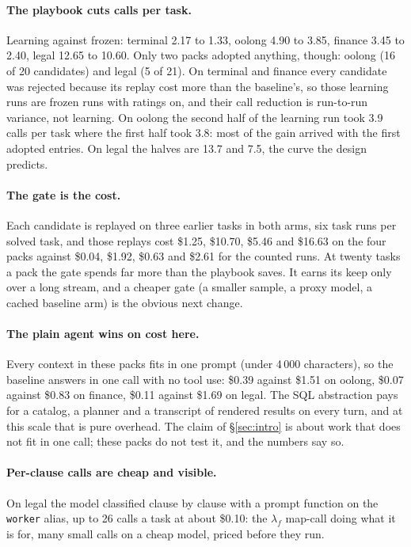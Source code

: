 \documentclass[11pt,a4paper]{article}
\newcommand{\code}[1]{\texttt{#1}}
\newcommand{\lmap}{\lambda_f}
\begin{document}
\paragraph{The playbook cuts calls per task.} Learning against frozen: terminal
2.17 to 1.33, oolong 4.90 to 3.85, finance 3.45 to 2.40, legal 12.65 to 10.60.
Only two packs adopted anything, though: oolong (16 of 20 candidates) and legal
(5 of 21). On terminal and finance every candidate was rejected because its
replay cost more than the baseline's, so those learning runs are frozen runs
with ratings on, and their call reduction is run-to-run variance, not learning.
On oolong the second half of the learning run took 3.9 calls per task where the
first half took 3.8: most of the gain arrived with the first adopted entries.
On legal the halves are 13.7 and 7.5, the curve the design predicts.

\paragraph{The gate is the cost.} Each candidate is replayed on three earlier
tasks in both arms, six task runs per solved task, and those replays cost
\$1.25, \$10.70, \$5.46 and \$16.63 on the four packs against \$0.04, \$1.92,
\$0.63 and \$2.61 for the counted runs. At twenty tasks a pack the gate spends
far more than the playbook saves. It earns its keep only over a long stream, and
a cheaper gate (a smaller sample, a proxy model, a cached baseline arm) is the
obvious next change.

\paragraph{The plain agent wins on cost here.} Every context in these packs fits
in one prompt (under 4\,000 characters), so the baseline answers in one call
with no tool use: \$0.39 against \$1.51 on oolong, \$0.07 against \$0.83 on
finance, \$0.11 against \$1.69 on legal. The SQL abstraction pays for a catalog,
a planner and a transcript of rendered results on every turn, and at this scale
that is pure overhead. The claim of \S\ref{sec:intro} is about work that does
not fit in one call; these packs do not test it, and the numbers say so.

\paragraph{Per-clause calls are cheap and visible.} On legal the model
classified clause by clause with a prompt function on the \code{worker} alias,
up to 26 calls a task at about \$0.10: the $\lmap$ map-call doing what it is
for, many small calls on a cheap model, priced before they run.
\end{document}
